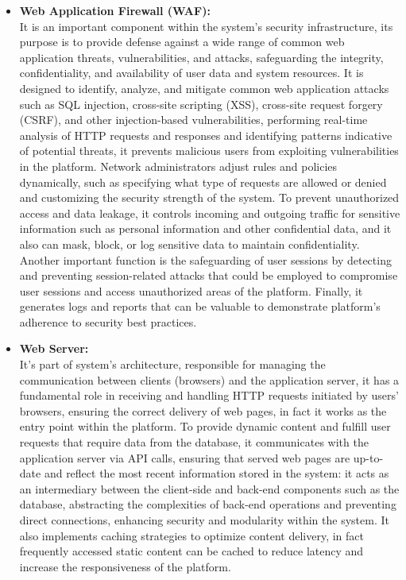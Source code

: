 \begin{itemize}
    \item \textbf{Web Application Firewall (WAF):} \\
    It is an important component within the system's security infrastructure, its purpose is to provide defense against a wide range of common web application threats, vulnerabilities, and attacks, safeguarding the integrity, confidentiality, and availability of user data and system resources. It is designed to identify, analyze, and mitigate common web application attacks such as SQL injection, cross-site scripting (XSS), cross-site request forgery (CSRF), and other injection-based vulnerabilities, performing real-time analysis of HTTP requests and responses and identifying patterns indicative of potential threats, it prevents malicious users from exploiting vulnerabilities in the platform. Network administrators adjust rules and policies dynamically, such as specifying what type of requests are allowed or denied and customizing the security strength of the system. To prevent unauthorized access and data leakage, it controls incoming and outgoing traffic for sensitive information such as personal information and other confidential data, and it also can mask, block, or log sensitive data to maintain confidentiality. Another important function is the safeguarding of user sessions by detecting and preventing session-related attacks that could be employed to compromise user sessions and access unauthorized areas of the platform. Finally, it generates logs and reports that can be valuable to demonstrate platform's adherence to security best practices.
    
    \item \textbf{Web Server:} \\
    It's part of system's architecture, responsible for managing the communication between clients (browsers) and the application server, it has a fundamental role in receiving and handling HTTP requests initiated by users' browsers, ensuring the correct delivery of web pages, in fact it works as the entry point within the platform. To provide dynamic content and fulfill user requests that require data from the database, it communicates with the application server via API calls, ensuring that served web pages are up-to-date and reflect the most recent information stored in the system: it acts as an intermediary between the client-side and back-end components such as the database, abstracting the complexities of back-end operations and preventing direct connections, enhancing security and modularity within the system. It also implements caching strategies to optimize content delivery, in fact frequently accessed static content can be cached to reduce latency and increase the responsiveness of the platform.
    

\end{itemize}
